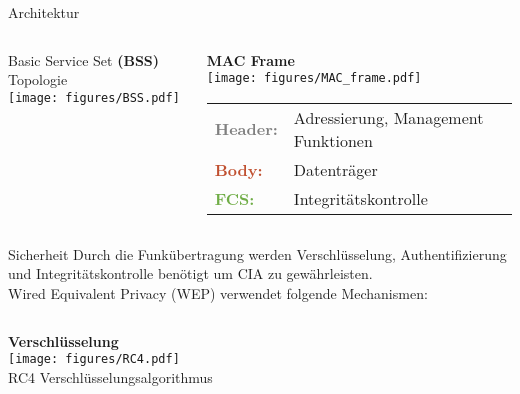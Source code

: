 {\begin{frame}{Architektur}
    \begin{columns}
        \begin{column}{0.3\textwidth}
            Basic Service Set \textbf{(BSS)} Topologie
            \\\vspace{0.5cm}
            \texttt{[image: figures/BSS.pdf]}
        \end{column}
        \begin{column}{0.6\textwidth}
            \textbf{MAC Frame}
            \\\vspace{0.5cm}
            \texttt{[image: figures/MAC\_frame.pdf]}
            \\\vspace{0.5cm}
            \renewcommand{\arraystretch}{1.6}
            \begin{tabular}{lp{4.5cm}}
                \textcolor[HTML]{7f7f7f}{\textbf{Header:}} & Adressierung, Management Funktionen \\
                \textcolor[HTML]{c05030}{\textbf{Body:}} & Datenträger \\
                \textcolor[HTML]{70ad47}{\textbf{FCS:}} & Integritätskontrolle \\
            \end{tabular}

        \end{column}
    \end{columns}
\end{frame}


\begin{frame}{Sicherheit}
    \small
    Durch die Funkübertragung werden Verschlüsselung, Authentifizierung und Integritätskontrolle benötigt um CIA zu gewährleisten. \pause
    \\\vspace{0.5cm}
    \centering
    Wired Equivalent Privacy (WEP) verwendet folgende Mechanismen:
    \\\vspace{0.4cm}

    \begin{columns}
        \begin{column}{.6\textwidth}
           \centering
           \textbf{Verschlüsselung}
           \\\vspace{0.3cm}
           \texttt{[image: figures/RC4.pdf]}
           \tiny
           \\RC4 Verschlüsselungsalgorithmus
        \end{column}


\end{columns}
\end{frame}}
